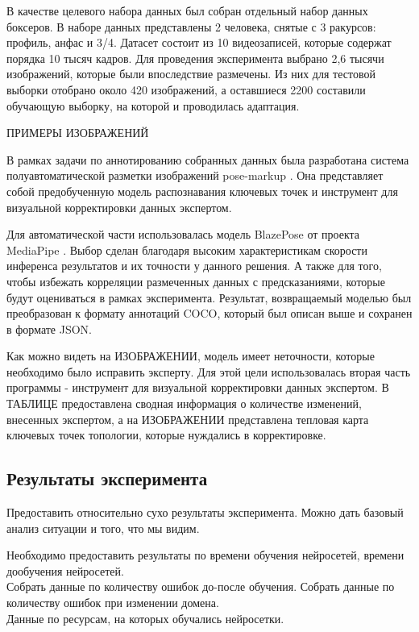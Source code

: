 


В качестве целевого набора данных был собран отдельный набор данных боксеров. В наборе данных представлены 2 человека, снятые с 3 ракурсов: профиль, анфас и 3/4. Датасет состоит из 10 видеозаписей, которые содержат порядка 10 тысяч кадров. Для проведения эксперимента выбрано 2,6 тысячи изображений, которые были впоследствие размечены. Из них для тестовой выборки отобрано около 420 изображений, а оставшиеся 2200 составили обучающую выборку, на которой и проводилась адаптация.

ПРИМЕРЫ ИЗОБРАЖЕНИЙ

В рамках задачи по аннотированию собранных данных была разработана система полуавтоматической разметки изображений pose-markup \cite{pose_markup}. Она представляет собой предобученную модель распознавания ключевых точек и инструмент для визуальной корректировки данных экспертом.

Для автоматической части использовалась модель BlazePose от проекта MediaPipe \cite{mediapipe}. Выбор сделан благодаря высоким характеристикам скорости инференса результатов и их точности у данного решения. А также для того, чтобы избежать корреляции размеченных данных с предсказаниями, которые будут оцениваться в рамках эксперимента. Результат, возвращаемый моделью был преобразован к формату аннотаций COCO, который был описан выше и сохранен в формате JSON. 

Как можно видеть на ИЗОБРАЖЕНИИ, модель имеет неточности, которые необходимо было исправить эксперту. Для этой цели использовалась вторая часть программы - инструмент для визуальной корректировки данных экспертом. В ТАБЛИЦЕ  предоставлена сводная информация о количестве изменений, внесенных экспертом, а на ИЗОБРАЖЕНИИ представлена тепловая карта ключевых точек топологии, которые нуждались в корректировке. 



\subsection{Результаты эксперимента}

Предоставить относительно сухо результаты эксперимента. Можно дать базовый анализ ситуации и того, что мы видим.

Необходимо предоставить результаты по времени обучения нейросетей, времени дообучения нейросетей. \\ 
Собрать данные по количеству ошибок до-после обучения. Собрать данные по количеству ошибок при изменении домена. \\ 
Данные по ресурсам, на которых обучались нейросетки.


\newpage